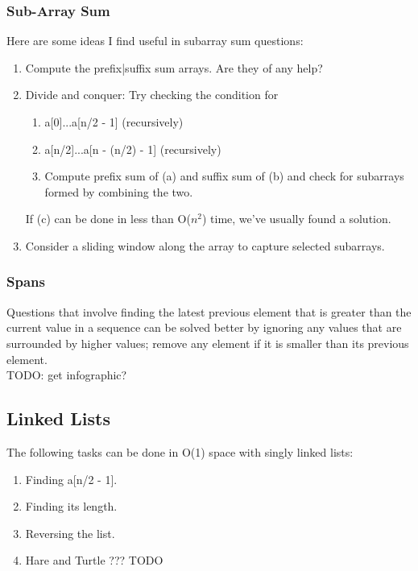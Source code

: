 \documentclass{article}
\begin{document}
\subsubsection{Sub-Array Sum}
Here are some ideas I find useful in subarray sum questions:
\begin{enumerate}
    \item Compute the prefix|suffix sum arrays. Are they of any help?
    \item Divide and conquer: Try checking the condition for
    \begin{enumerate}
        \item a[0]...a[n/2 - 1] (recursively)
        \item a[n/2]...a[n - (n/2) - 1] (recursively)
        \item Compute prefix sum of (a) and suffix sum of (b)
        and check for subarrays formed by combining the two.
    \end{enumerate}
    If (c) can be done in less than O($n^2$) time, we've usually found a solution.
    \item Consider a sliding window along the array to capture selected
    subarrays. 
\end{enumerate}
\subsubsection{Spans}
Questions that involve finding the latest previous element that is greater than the 
current value in a sequence can be solved better by ignoring any values that are
surrounded by higher values; remove any element if it is smaller than its previous
element.\\
TODO: get infographic?
\subsection{Linked Lists}
The following tasks can be done in O(1) space with singly linked lists:
\begin{enumerate}
    \item Finding a[n/2 - 1].
    \item Finding its length.
    \item Reversing the list.
    \item Hare and Turtle ??? TODO
\end{enumerate}
\end{document}
